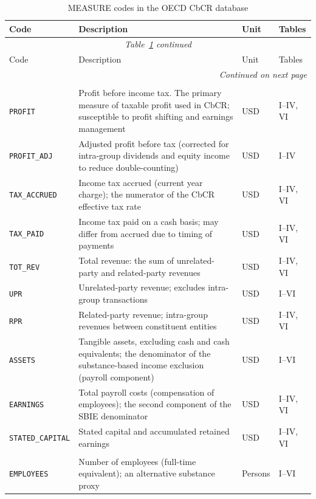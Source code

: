 \documentclass[11pt,a4paper]{article}
\newcommand{\code}[1]{\texttt{#1}}
\begin{document}
\begin{longtable}{@{}lp{6cm}lp{2.5cm}@{}}
\caption{MEASURE codes in the OECD CbCR database}\label{tab:measures}\\
\toprule
Code & Description & Unit & Tables \\
\midrule
\endfirsthead
\multicolumn{4}{c}{\textit{Table~\ref{tab:measures} continued}}\\
\toprule
Code & Description & Unit & Tables \\
\midrule
\endhead
\midrule
\multicolumn{4}{r}{\textit{Continued on next page}}\\
\endfoot
\bottomrule
\endlastfoot
\multicolumn{4}{l}{\textit{Financial aggregates}}\\
\code{PROFIT}         & Profit before income tax. The primary measure of taxable profit used in CbCR; susceptible to profit shifting and earnings management & USD & I--IV, VI \\
\code{PROFIT\_ADJ}    & Adjusted profit before tax (corrected for intra-group dividends and equity income to reduce double-counting) & USD & I--IV \\
\code{TAX\_ACCRUED}   & Income tax accrued (current year charge); the numerator of the CbCR effective tax rate & USD & I--IV, VI \\
\code{TAX\_PAID}      & Income tax paid on a cash basis; may differ from accrued due to timing of payments & USD & I--IV, VI \\
\code{TOT\_REV}       & Total revenue: the sum of unrelated-party and related-party revenues & USD & I--IV, VI \\
\code{UPR}            & Unrelated-party revenue; excludes intra-group transactions & USD & I--VI \\
\code{RPR}            & Related-party revenue; intra-group revenues between constituent entities & USD & I--IV, VI \\
\code{ASSETS}         & Tangible assets, excluding cash and cash equivalents; the denominator of the substance-based income exclusion (payroll component) & USD & I--VI \\
\code{EARNINGS}       & Total payroll costs (compensation of employees); the second component of the SBIE denominator & USD & I--IV, VI \\
\code{STATED\_CAPITAL}& Stated capital and accumulated retained earnings & USD & I--IV, VI \\
\addlinespace
\multicolumn{4}{l}{\textit{Count variables}}\\
\code{EMPLOYEES}      & Number of employees (full-time equivalent); an alternative substance proxy & Persons & I--VI \\

\end{longtable}
\end{document}
